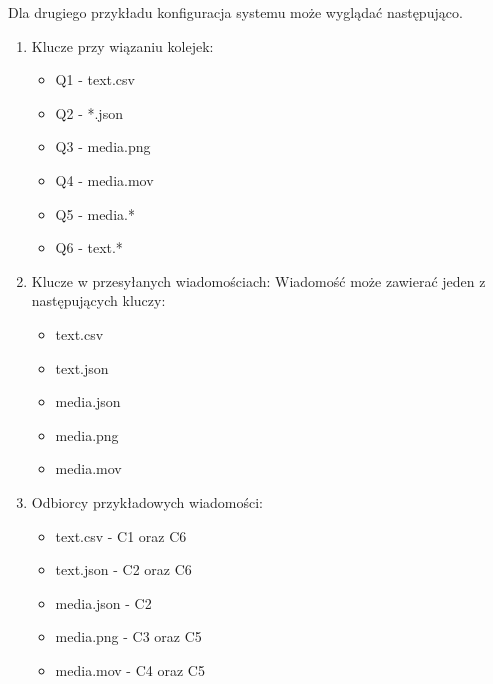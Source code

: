 \documentclass{article}
\begin{document}
        Dla drugiego przykładu konfiguracja systemu może wyglądać następująco. 
        \begin{enumerate}
            \item Klucze przy wiązaniu kolejek: \begin{itemize}
                \item Q1 - text.csv
                \item Q2 - *.json
                \item Q3 - media.png
                \item Q4 - media.mov
                \item Q5 - media.*
                \item Q6 - text.*
                \end{itemize}
            \item Klucze w przesyłanych wiadomościach:
                Wiadomość może zawierać jeden z następujących kluczy:
                \begin{itemize}
                    \item text.csv
                    \item text.json
                    \item media.json
                    \item media.png
                    \item media.mov
                \end{itemize}
            \item Odbiorcy przykładowych wiadomości: 
                \begin{itemize}
                    \item text.csv - C1 oraz C6
                    \item text.json - C2 oraz C6
                    \item media.json - C2
                    \item media.png - C3 oraz C5
                    \item media.mov - C4 oraz C5
                \end{itemize}
        \end{enumerate}

        
\end{document}
